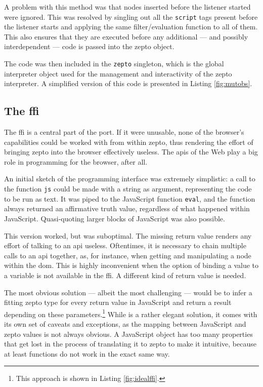 \documentclass[oneside,11pt,xetex]{scrbook}
\begin{document}
A problem with this method was that nodes inserted before the listener started were ignored.
This was resolved by singling out all the \texttt{script} tags present before the listener
starts and applying the same filter/evaluation function to all of them. This also ensures
that they are executed before any additional --- and possibly interdependent --- code is
passed into the zepto object.

The code was then included in the \texttt{zepto} singleton, which is the global interpreter object
used for the management and interactivity of the zepto interpreter. A simplified version of this
code is presented in Listing \ref{fig:mutobs}.

\subsection{The \gls{ffi}}
\label{sec:ffi}

The \gls{ffi} is a central part of the port. If it were unusable, none of the browser's
capabilities could be worked with from within zepto, thus rendering the effort of bringing zepto
into the browser effectively useless. The \gls{api}s of the Web play a big role in
programming for the browser, after all.

An initial sketch of the programming interface was extremely simplistic: a call to the
function \texttt{js} could be made with a string as argument, representing the code to
be run as text. It was piped to the JavaScript function
\texttt{eval}, and the function always returned an affirmative truth value, regardless of
what happened within JavaScript. Quasi-quoting larger blocks of JavaScript was also possible.

This version worked, but was suboptimal. The missing return value renders any effort of talking to
an \gls{api} useless. Oftentimes, it is necessary to chain multiple calls to an \gls{api} together,
as, for instance, when getting and manipulating a node within the \gls{dom}. This is highly
inconvenient when the option of binding a value to a variable is not available in the \gls{ffi}.
A different kind of return value is needed.

The most obvious solution --- albeit the most challenging --- would be to infer a fitting zepto
type for every return value in JavaScript and return a result depending on these
parameters.\footnote{This approach is shown in Listing \ref{fig:idealffi}.} While is a rather elegant
solution, it comes with its own set of caveats and exceptions, as the mapping between JavaScript
and zepto values is not always obvious. A JavaScript object has too many properties that get
lost in the process of translating it to zepto to make it intuitive, because at least functions
do not work in the exact same way.
\end{document}
